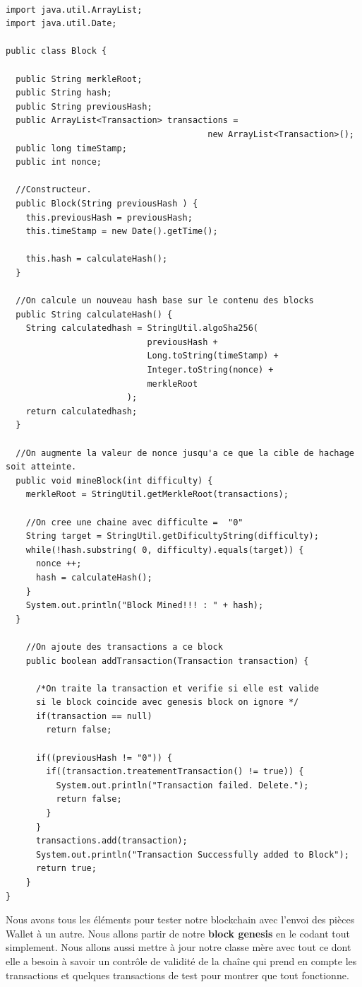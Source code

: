 \documentclass[12pt]{report}
\begin{document}
\begin{lstlisting}

import java.util.ArrayList;
import java.util.Date;

public class Block {
	
  public String merkleRoot;
  public String hash;
  public String previousHash;  
  public ArrayList<Transaction> transactions = 
                                        new ArrayList<Transaction>(); 
  public long timeStamp;
  public int nonce;
	
  //Constructeur.  
  public Block(String previousHash ) {
    this.previousHash = previousHash;
    this.timeStamp = new Date().getTime();
		
    this.hash = calculateHash();
  }
	
  //On calcule un nouveau hash base sur le contenu des blocks
  public String calculateHash() {
    String calculatedhash = StringUtil.algoSha256( 
                            previousHash +
                            Long.toString(timeStamp) +
                            Integer.toString(nonce) + 
                            merkleRoot
                        );
    return calculatedhash;
  }
	
  //On augmente la valeur de nonce jusqu'a ce que la cible de hachage soit atteinte.
  public void mineBlock(int difficulty) {
    merkleRoot = StringUtil.getMerkleRoot(transactions);
    
    //On cree une chaine avec difficulte =  "0"
	String target = StringUtil.getDificultyString(difficulty); 
    while(!hash.substring( 0, difficulty).equals(target)) {
      nonce ++;
      hash = calculateHash();
    }
    System.out.println("Block Mined!!! : " + hash);
  }
	
    //On ajoute des transactions a ce block
    public boolean addTransaction(Transaction transaction) {
    
      /*On traite la transaction et verifie si elle est valide
      si le block coincide avec genesis block on ignore */
      if(transaction == null) 
        return false;	
        
      if((previousHash != "0")) {
        if((transaction.treatementTransaction() != true)) {
          System.out.println("Transaction failed. Delete.");
          return false;
        }
      }
      transactions.add(transaction);
      System.out.println("Transaction Successfully added to Block");
      return true;
    }
}
\end{lstlisting}


\hspace{1cm}Nous avons tous les éléments pour tester notre blockchain avec l'envoi des pièces Wallet à un autre. Nous allons partir de notre \textbf{block genesis} en le codant tout simplement. Nous allons aussi mettre à jour notre classe mère avec tout ce dont elle a besoin à savoir un contrôle de validité de la chaîne qui prend en compte les transactions et quelques transactions de test pour montrer que tout fonctionne.
\end{document}
